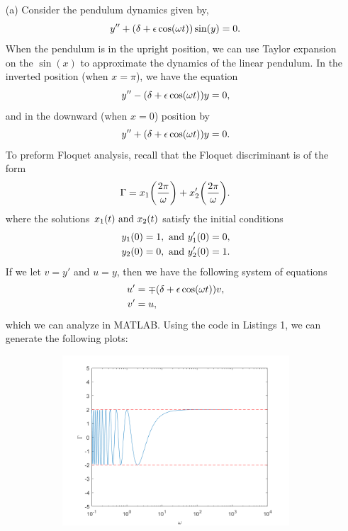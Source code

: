 \documentclass[12pt]{report}
\begin{document}
\begin{solution}
    \begin{enumerate}
        \item [(a)]
        \noindent
        Consider the pendulum dynamics given by,
        \begin{equation*}
            y'' + {\left(\delta + {\epsilon} \cos({\omega} t)\right)}\sin(y) = 0.
        \end{equation*}
        When the pendulum is in the upright position, we can use Taylor expansion on the $\sin(x)$ to approximate the dynamics of the linear pendulum. In the inverted position (when $x = \pi$), we have the equation 
        \[ 
            y'' - {\left(\delta + {\epsilon} \cos({\omega} t)\right)}y = 0,
        \]
        and in the downward (when $x = 0$) position by
        \[ 
            y'' + {\left(\delta + {\epsilon} \cos({\omega} t)\right)}y = 0.
        \]
        To preform Floquet analysis, recall that the Floquet discriminant is of the form
        \[ 
            \Gamma = x_1{\left(\frac{2\pi}{{\omega}}\right)} + x_2'{\left(\frac{2\pi}{{\omega}}\right)}.
        \]
        where the solutions $x_1(t) {~\text{and}~} x_2(t)$ satisfy the initial conditions
        \begin{align*}
            &y_1(0) = 1, {~\text{and}~} y_1'(0) = 0,\\
            &y_2(0) = 0, {~\text{and}~} y_2'(0) = 1.
        \end{align*} 
        If we let $v = y'$ and $u = y$, then we have the following system of equations
        \begin{align*}
            u' &= \mp {\left(\delta + {\epsilon}\cos({\omega}t)\right)}v,\\
            v' &= u,
        \end{align*}
        which we can analyze in MATLAB. Using the code in Listings 1, we can generate the following plots:
        \begin{figure}[H]
            \begin{subfigure}[b]{0.5\linewidth}
                \centering
                \includegraphics[width=\linewidth]{images/d1.png}

\end{subfigure}
\end{figure}
\end{enumerate}
\end{solution}
\end{document}
